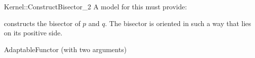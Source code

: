 \begin{ccRefFunctionObjectConcept}{Kernel::ConstructBisector_2}
A model for this must provide:


{constructs the bisector of $p$ and $q$.
The bisector is oriented in such a way that  lies on its
positive side. }

\ccRefines
AdaptableFunctor (with two arguments)

\end{ccRefFunctionObjectConcept}
